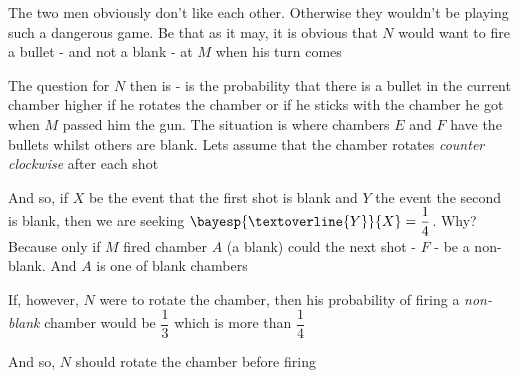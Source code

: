 \begin{solution}
	The two men obviously don't like each other. Otherwise they wouldn't be playing such 
	a dangerous game. Be that as it may, it is obvious that $N$ would want to fire a bullet - and not a 
	blank - at $M$ when his turn comes
	
	The question for $N$ then is - is the probability that there is a bullet in the current
	chamber higher if he rotates the chamber or if he sticks with the chamber he got when $M$
	passed him the gun. The situation is \asif where chambers $E$ and $F$ have the bullets whilst 
	others are blank. Lets assume that the chamber rotates \textit{counter clockwise} after each shot
	
	And so, if $X$ be the event that the first shot is blank and $Y$ the event the second
	is blank, then we are seeking $\bayesp{\textoverline{Y}}{X} = \dfrac{1}{4}$. Why? Because 
	only if $M$ fired chamber $A$ (a blank) could the next shot - $F$ - be a non-blank. And $A$ 
	is one of  blank chambers
	
	If, however, $N$ were to rotate the chamber, then his probability of firing a \textit{non-blank} 
	chamber would be $\dfrac{1}{3}$ which is more than $\dfrac{1}{4}$
	
	And so, $N$ should rotate the chamber before firing
	
\end{solution}
